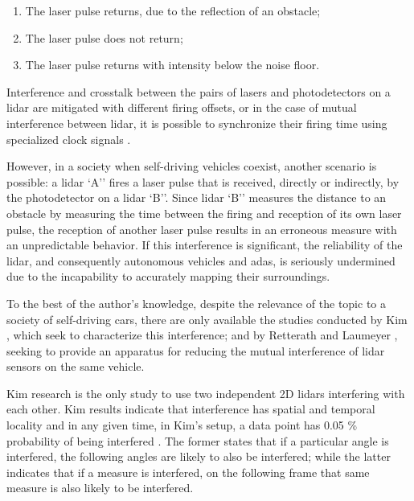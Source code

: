 \begin{enumerate}
\item The \ac{laser} pulse returns, due to the reflection of an obstacle;
\item The \ac{laser} pulse does not return;
\item The \ac{laser} pulse returns with intensity below the noise floor.
\end{enumerate}

Interference and crosstalk between the pairs of \acp{laser} and photodetectors on a \ac{lidar} are mitigated with different firing offsets, or in the case of mutual interference between \ac{lidar}, it is possible to synchronize their firing time using specialized clock signals \cite{vlp16}.

However, in a society when self-driving vehicles coexist, another scenario is possible: a \ac{lidar} `A'' fires a \ac{laser} pulse that is received, directly or indirectly, by the photodetector on a \ac{lidar} `B''. Since \ac{lidar} `B'' measures the distance to an obstacle by measuring the time between the firing and reception of its own \ac{laser} pulse, the reception of another \ac{laser} pulse results in an erroneous measure with an unpredictable behavior. If this interference is significant, the reliability of the \ac{lidar}, and consequently autonomous vehicles and \ac{adas}, is seriously undermined due to the incapability to accurately mapping their surroundings.

To the best of the author's knowledge, despite the relevance of the topic to a society of self-driving cars, there are only available the studies conducted by Kim \etal \cite{Kim2017, Kim2015}, which seek to characterize this interference; and by Retterath and Laumeyer \cite{Al.2013}, seeking to provide an apparatus for reducing the mutual interference of \ac{lidar} sensors on the same vehicle.


Kim \etal research %
is the only study to use two independent 2D \ac{lidar}s interfering with each other. Kim \etal results indicate that interference has spatial and temporal locality \cite{Kim2015} and in any given time, in Kim's setup, a data point has 0.05 \% probability of being interfered \cite{Kim2015}.
The former states that if a particular angle is interfered, the following angles are likely to also be interfered; while the latter indicates that if a measure is interfered, on the following frame that same measure is also likely to be interfered. 


